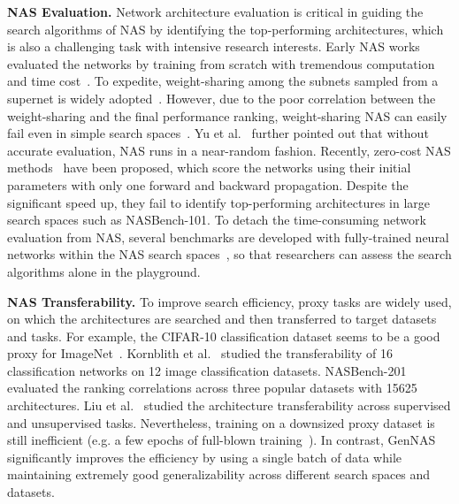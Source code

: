 \documentclass{article}
\begin{document}
\textbf{NAS Evaluation.}
Network architecture evaluation is critical in guiding the search algorithms of NAS by identifying the top-performing architectures, which is also a challenging task with intensive research interests.
Early NAS works evaluated the networks by training from scratch with tremendous computation and time cost~\cite{zoph2018learning,real2019regularized}. 
To expedite, weight-sharing among the subnets sampled from a supernet is widely adopted~\cite{liu2018darts,li2020random,cai2018proxylessnas,xu2019pc,li2020edd}.
However, due to the poor correlation between the weight-sharing and the final performance ranking, weight-sharing NAS can easily fail even in simple search spaces~\cite{zela2019understanding,dong2020bench}.
Yu et al.~\cite{yu2019evaluating} further pointed out that without accurate evaluation, NAS runs in a near-random fashion.
Recently, zero-cost NAS methods~\cite{mellor2020neural, abdelfattah2021zero,dey2021fear,li2021flash} have been proposed, which score the networks using their initial parameters with only one forward and backward propagation. Despite the significant speed up, they fail to identify top-performing architectures in large search spaces such as NASBench-101.
To detach the time-consuming network evaluation from NAS, several benchmarks are developed with fully-trained neural networks within the NAS search spaces~\cite{siems2020bench,ying2019bench,dong2020bench,klyuchnikov2020bench,su2021prioritized}, so that researchers can assess the search algorithms alone in the playground. 


\textbf{NAS Transferability.}
To improve search efficiency, proxy tasks are widely used, on which the architectures are searched and then transferred to target datasets and tasks. For example, the CIFAR-10 classification dataset seems to be a good proxy for ImageNet~\cite{zoph2018learning,liu2018darts}. Kornblith et al.~\cite{kornblith2019better} studied the transferability of 16 classification networks on 12 image classification datasets. NASBench-201~\cite{dong2020bench} evaluated the ranking correlations across three popular datasets with 15625 architectures. Liu et al.~\cite{liu2020labels} studied the architecture transferability across supervised and unsupervised tasks.
Nevertheless, training on a downsized proxy dataset is still inefficient (e.g. a few epochs of full-blown training~\cite{liu2020labels}). In contrast, GenNAS significantly improves the efficiency by using a single batch of data while maintaining extremely good generalizability across different search spaces and datasets.
\end{document}
